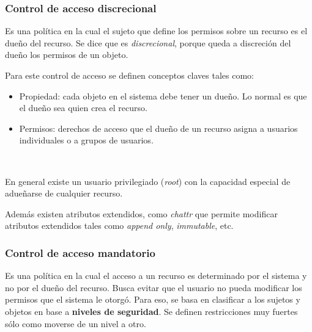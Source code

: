 \documentclass[]{article}
\begin{document}
\subsubsection{Control de acceso discrecional}
Es una política en la cual el sujeto que define los permisos sobre un recurso es el dueño del recurso. Se dice que es \emph{discrecional}, porque queda a discreción del dueño los permisos de un objeto.

Para este control de acceso se definen conceptos claves tales como:
\begin{itemize}
	\item Propiedad: cada objeto en el sistema debe tener un dueño. Lo normal es que el dueño sea quien crea el recurso.
	\item Permisos: derechos de acceso que el dueño de un recurso asigna a usuarios individuales o a grupos de usuarios.
\end{itemize}

 ~\newline


En general existe un usuario privilegiado (\emph{root}) con la capacidad especial de adueñarse de cualquier recurso.


Además existen atributos extendidos, como \emph{chattr} que permite modificar atributos extendidos tales como \emph{append only}, \emph{immutable}, etc.


\subsubsection{Control de acceso mandatorio}
Es una política en la cual el acceso a un recurso es determinado por el sistema y no por el dueño del recurso. Busca evitar que el usuario no pueda modificar los permisos que el sistema le otorgó. Para eso, se basa en clasificar a los sujetos y objetos en base a \textbf{niveles de seguridad}. Se definen restricciones muy fuertes sólo como moverse de un nivel a otro.
\end{document}
